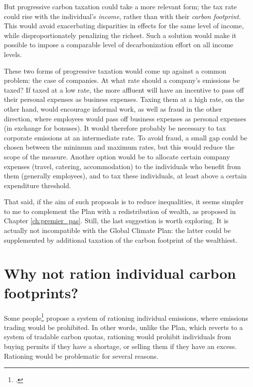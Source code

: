 \documentclass[a5paper,english,openany]{memoir}
\begin{document}
But progressive carbon taxation could take a more relevant form; %
the tax rate could rise with the individual's \textit{income}, rather than with their  %
\textit{carbon footprint}. This would avoid exacerbating disparities in effects for the same level of income, while disproportionately penalizing the richest. Such a solution would make it possible to impose a comparable level of decarbonization effort on all income levels. 

 These two forms of progressive taxation would come up against a common problem: the case of companies. At what rate should a company's emissions be taxed? If taxed at a low rate, the more affluent will have an incentive to pass off their personal expenses as business expenses. Taxing them at a high rate, on the other hand, would encourage informal work, as well as fraud in the other direction, where employees would pass off business expenses as personal expenses (in exchange for bonuses). It would therefore probably be necessary to tax corporate emissions at an intermediate rate. To avoid fraud, a small gap could be chosen between the minimum and maximum rates, but this would reduce the scope of the measure. Another option would be to allocate certain company expenses (travel, catering, accommodation) to the individuals who benefit from them (generally employees), and to tax these individuals, at least above a certain expenditure threshold. 

That said, if the aim of such proposals is to reduce inequalities, it seems simpler to me to complement the Plan with a redistribution of wealth, as proposed in Chapter \ref{ch:premier_pas}. Still, the last suggestion is worth exploring. It is actually not incompatible with the Global Climate Plan: the latter could be supplemented by additional taxation of the carbon footprint of the wealthiest. 

\section*{\normalsize Why not ration individual carbon footprints?}\label{q:rationing}

Some people\footnote{\citet{wood_rationing_2023}.} propose a system of rationing individual emissions, where emissions trading would be prohibited. In other words, unlike the %
Plan, which reverts to a system of tradable carbon quotas, rationing would prohibit individuals from buying permits if they have a shortage, or selling them if they have an excess. %
Rationing would be problematic for several reasons. 
\end{document}
